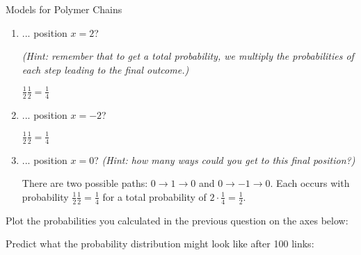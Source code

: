 \begin{activity}{Models for Polymer Chains}
\begin{ctqs}
\begin{enumerate}
			\item ... position $x=2$?
			
				\emph{(Hint: remember that to get a total probability, we \emph{multiply} the probabilities of each step leading to the final outcome.)}
				
				\begin{solution}[1in]
				
					$\frac{1}{2}\frac{1}{2} = \frac{1}{4}$
				
				\end{solution}
				
			\item ... position $x=-2$?
				
				\begin{solution}[1in]
				
					$\frac{1}{2}\frac{1}{2} = \frac{1}{4}$
					
				\end{solution}
			
			\clearpage
			\item ... position $x=0$?
				\emph{(Hint: how many ways could you get to this final position?)}
				
				\begin{solution}[1in]
				
					There are two possible paths: $0\to 1\to 0$ and $0 \to -1 \to 0$.  Each occurs with probability $\frac{1}{2}\frac{1}{2} = \frac{1}{4}$ for a total probability of $2\cdot\frac{1}{4} = \frac{1}{2}$.
				
				\end{solution}
			
		\end{enumerate}
		
	\question Plot the probabilities you calculated in the previous question on the axes below:
	
		\begin{solution}[2.25in]
		\end{solution}
	
	\question Predict what the probability distribution might look like after 100 links:
	
		\begin{solution}[2.25in]
		\end{solution}
	

\end{ctqs}
\end{activity}
